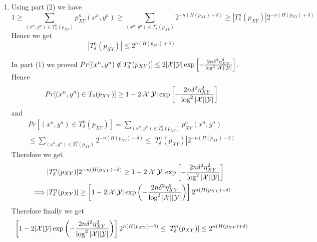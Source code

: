 \documentclass[a4paper, 11pt]{article}
\begin{document}
{\begin{enumerate}
		Now using the claim we get $$2^{-n\lt( H(p_{XY})-\frac{\delta H(p_{XY})}{\log |\mcX||\mcY|}\rt)}\leq 2^{-n(H(p_{XY})-\delta)}$$
		$$2^{-n\lt( H(p_{XY})+\frac{\delta H(p_{XY})}{\log |\mcX||\mcY|} \rt)}\geq 2^{-n(H(p_{XY})+\delta)}$$
		
Hence we get if $(x^n,y^n)\in T_{\delta}^n(p_{XY})$ then 
$$ 2^{-n(H(p_{XY})+\delta)} \leq p^n_{XY}(x^n,y^n)\leq 2^{-n(H(p_{XY})-\delta)}$$
		
		
		\item Using part (2) we have $$1\geq \sum_{(x^n,y^n)\in T_{\delta}^n(p_{XY})}p_{XY}^n(x^n,y^n)\geq \sum_{(x^n,y^n)\in T_{\delta}^n(p_{XY})}2^{-n(H(p_{XY})+\delta)} \geq |T_{\delta}^n(p_{XY})|2^{-n(H(p_{XY})+\delta)} $$Hence we get $$|T_{\delta}^n(p_{XY})|\leq2^{n(H(p_{XY})+\delta)} $$
		
		In part (1) we proved  $Pr[(x^n,y^n)\notin T_{\delta}^n(p_{XY})]\leq  2|\mathcal{X}|\mathcal{Y}|\exp\left[ -\frac{2n\delta^2 \eta_{XY}^2}{\log^2 |\mathcal{X}||\mathcal{Y}|} \right]$. Hence $$Pr[(x^n,y^n)\in T_{\delta}(p_{XY})]\geq 1-2|\mathcal{X}|\mathcal{Y}|\exp\left[ -\frac{2n\delta^2 \eta_{XY}^2}{\log^2 |\mathcal{X}||\mathcal{Y}|} \right]$$ and 
		\begin{multline*}
			Pr[(x^n,y^n)\in T_{\delta}^n(p_{XY})]=\sum_{(x^n,y^n)\in T_{\delta}^n(p_{XY})} p_{XY}^n(x^n,y^n)\\
			\leq \sum_{(x^n,y^n)\in T_{\delta}^n(p_{XY})}2^{-n(H(p_{XY})-\delta)}\leq |T_{\delta}^n(p_{XY})|2^{-n(H(p_{XY})-\delta)}
		\end{multline*}Therefore we get \begin{align*}
		& |T_{\delta}^n(p_{XY})|2^{-n(H(p_{XY})-\delta)}\geq 1-2|\mathcal{X}|\mathcal{Y}|\exp\left[ -\frac{2n\delta^2 \eta_{XY}^2}{\log^2 |\mathcal{X}||\mathcal{Y}|} \right]\\
		\implies & |T_{\delta}^n(p_{XY})|\geq \left[  1-2|\mathcal{X}|\mathcal{Y}|\exp\left( -\frac{2n\delta^2 \eta_{XY}^2}{\log^2 |\mathcal{X}||\mathcal{Y}|} \right)  \right]2^{n(H(p_{XY})-\delta)}
		\end{align*}Therefore finally we get $$
		\left[  1-2|\mathcal{X}|\mathcal{Y}|\exp\left( -\frac{2n\delta^2 \eta_{XY}^2}{\log^2 |\mathcal{X}||\mathcal{Y}|} \right)  \right]2^{n(H(p_{XY})-\delta)}\leq |T_{\delta}^n(p_{XY})|\leq 2^{n(H(p_{XY})+\delta)} $$
		

\end{enumerate}}
\end{document}
